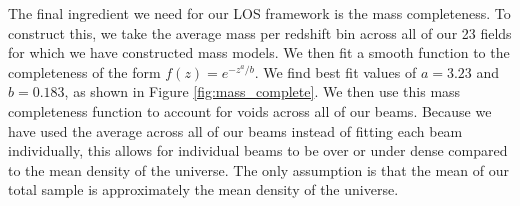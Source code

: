 The final ingredient we need for our LOS framework is the mass completeness. To construct this, we take the average mass per redshift bin across all of our 23 fields for which we have constructed mass models. We then fit a smooth function to the completeness of the form $f(z) = e^{-z^a / b}$. We find best fit values of $a = 3.23$ and $b = 0.183$, as shown in Figure \ref{fig:mass_complete}. We then use this mass completeness function to account for voids across all of our beams. Because we have used the average across all of our beams instead of fitting each beam individually, this allows for individual beams to be over or under dense compared to the mean density of the universe. The only assumption is that the mean of our total sample is approximately the mean density of the universe.  
  
  